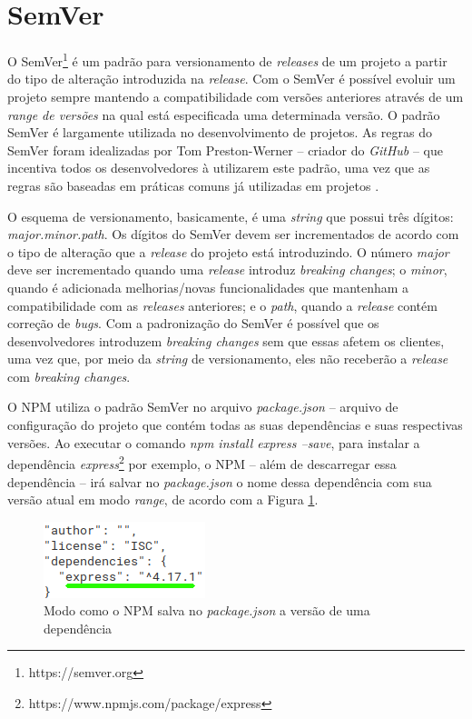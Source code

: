 \section{\gls{SemVer}}
\label{ref-teo:semver}
O \gls{SemVer}\footnote{https://semver.org} é um padrão para versionamento de \textit{releases} de um projeto a partir do tipo de alteração introduzida na \textit{release}. Com o \gls{SemVer} é possível evoluir um projeto sempre mantendo a compatibilidade com versões anteriores através de um \textit{range de versões} na qual está especificada uma determinada versão. O padrão \gls{SemVer} é largamente utilizada no desenvolvimento de projetos. As regras do \gls{SemVer} foram idealizadas por Tom Preston-Werner -- criador do \textit{GitHub} -- que incentiva todos os desenvolvedores à utilizarem este padrão, uma vez que as regras são baseadas em práticas comuns já utilizadas em projetos \cite{teorical_reference:semver}.

O esquema de versionamento, basicamente, é uma \textit{string} que possui três dígitos: \textit{major.minor.path}. Os dígitos do \gls{SemVer} devem ser incrementados de acordo com o tipo de alteração que a \textit{release} do projeto está introduzindo. O número \textit{major} deve ser incrementado quando uma \textit{release} introduz \textit{breaking changes}; o \textit{minor}, quando é adicionada melhorias/novas funcionalidades que mantenham a compatibilidade com as \textit{releases} anteriores; e o \textit{path}, quando a \textit{release} contém correção de \textit{bugs}. Com a padronização do \gls{SemVer} é possível que os desenvolvedores introduzem \textit{breaking changes} sem que essas afetem os clientes, uma vez que, por meio da \textit{string} de versionamento, eles não receberão a \textit{release} com \textit{breaking changes}.

O \gls{NPM} utiliza o padrão \gls{SemVer} no arquivo \textit{package.json} -- arquivo de configuração do projeto que contém todas as suas dependências e suas respectivas versões. Ao executar o comando \textit{npm install express --save}, para instalar a dependência \textit{express}\footnote{https://www.npmjs.com/package/express} por exemplo, o \gls{NPM} -- além de descarregar essa dependência -- irá salvar no \textit{package.json} o nome dessa dependência com sua versão atual em modo \textit{range}, de acordo com a Figura \ref{fig:dep_express}.

\begin{figure}
    \centering
    \includegraphics{figuras/dependencies_express.png}
    \caption{Modo como o \gls{NPM} salva no \textit{package.json} a versão de uma dependência}
    \label{fig:dep_express}
\end{figure}{}

